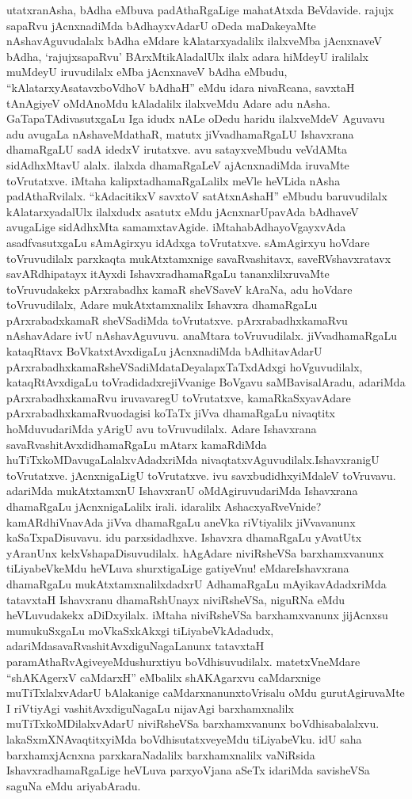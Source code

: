 \begin{artha}
utatxra\ndash  nAsha, bAdha eMbuva padAthaRgaLige mahatAtxda BeVdavide. rajujx sapaRvu jAcnxnadiMda bAdhayxvAdarU oDeda maDakeyaMte nAshavAguvudalalx bAdha eMdare kAlatarxyadalilx ilalxveMba jAcnxnaveV bAdha, `rajujxsapaRvu' BArxMtikAladalUlx ilalx adara hiMdeyU iralilalx muMdeyU iruvudilalx eMba jAcnxnaveV bAdha eMbudu, ``kAlatarxyAsatavxboVdhoV bAdhaH'' eMdu idara nivaRcana, savxtaH tAnAgiyeV oMdAnoMdu kAladalilx ilalxveMdu Adare adu nAsha. GaTapaTAdivasutxgaLu Iga idudx nALe oDedu haridu ilalxveMdeV Aguvavu adu avugaLa nAshaveMdathaR, matutx jiVvadhamaRgaLU Ishavxrana dhamaRgaLU sadA idedxV irutatxve. avu satayxveMbudu veVdAMta sidAdhxMtavU alalx. ilalxda dhamaRgaLeV ajAcnxnadiMda iruvaMte toVrutatxve. iMtaha kalipxtadhamaRgaLalilx meVle heVLida nAsha padAthaRvilalx. ``kAdacitikxV savxtoV satAtxnAshaH'' eMbudu baruvudilalx kAlatarxyadalUlx ilalxdudx asatutx eMdu jAcnxnarUpavAda bAdhaveV avugaLige sidAdhxMta samamxtavAgide. iMtaha\break bAdhayoVgayxvAda asadfvasutxgaLu sAmAgirxyu idAdxga toVrutatxve. sAmAgirxyu hoVdare toVruvudilalx parxkaqta mukAtxtamxnige savaRvashitavx, saveRVshavxratavx savARdhipatayx itAyxdi IshavxradhamaRgaLu tananxlilxruvaMte toVruvudakekx pArxrabadhx kamaR sheVSaveV kAraNa, adu hoVdare toVruvudilalx, Adare mukAtxtamxnalilx Ishavxra dhamaRgaLu pArxrabadxkamaR sheVSadiMda toVrutatxve. pArxrabadhxkamaRvu nAshavAdare ivU nAshavAguvuvu. anaMtara toVruvudilalx. jiVvadhamaRgaLu kataqRtavx BoVkatxtAvxdigaLu jAcnxnadiMda bAdhitavAdarU pArxrabadhxkamaRsheVSadiMda\break taDeyalapxTaTxdAdxgi hoVguvudilalx, kataqRtAvxdigaLu toVradidadxre\break jiVvanige BoVgavu saMBavisalAradu, adariMda pArxrabadhxkamaRvu iruvavaregU toVrutatxve, kamaRkaSxyavAdare pArxrabadhxkamaRvu\break odagisi koTaTx jiVva dhamaRgaLu nivaqtitx hoMduvudariMda yArigU avu toVruvudilalx. Adare Ishavxrana savaRvashitAvxdidhamaRgaLu mAtarx kamaRdiMda huTiTxkoMDavugaLalalxvAdadxriMda nivaqtatxvAguvudilalx.\break IshavxranigU toVrutatxve. jAcnxnigaLigU toVrutatxve. ivu savxbudidhxyiMdaleV toVruvavu. adariMda mukAtxtamxnU IshavxranU oMdAgiruvudariMda Ishavxrana dhamaRgaLu jAcnxnigaLalilx irali. idaralilx AshacxyaRveVnide? kamARdhiVnavAda jiVva dhamaRgaLu aneVka riVtiyalilx jiVvavanunx kaSaTxpaDisuvavu. idu parxsidadhxve. Ishavxra dhamaRgaLu yAvatUtx yAranUnx kelxVshapaDisuvudilalx. hAgAdare niviRsheVSa barxhamxvanunx tiLiyabeVkeMdu heVLuva shurxtigaLige gatiyeVnu! eMdare\ndash  Ishavxrana dhamaRgaLu mukAtxtamxnalilxdadxrU AdhamaRgaLu mAyikavAdadxriMda tatavxtaH Ishavxranu dhamaRshUnayx niviRsheVSa, niguRNa eMdu heVLuvudakekx aDiDxyilalx. iMtaha niviRsheVSa barxhamxvanunx jijAcnxsu mumukuSxgaLu moVkaSxkAkxgi tiLiyabeVkAdadudx, adariMda\break savaRvashitAvxdiguNagaLanunx tatavxtaH paramAthaRvAgiveyeMdu\break shurxtiyu boVdhisuvudilalx. matetxVneMdare ``shAKAgerxV caMdarxH'' eMbalilx shAKAgarxvu caMdarxnige muTiTxlalxvAdarU bAlakanige caMdarxnanunx\break toVrisalu oMdu gurutAgiruvaMte I riVtiyAgi vashitAvxdiguNagaLu nijavAgi barxhamxnalilx muTiTxkoMDilalxvAdarU niviRsheVSa barxhamxvanunx boVdhisabalalxvu. lakaSxmXNAvaqtitxyiMda boVdhisutatxveyeMdu tiLiyabeVku. idU saha barxhamxjAcnxna parxkaraNadalilx barxhamxnalilx vaNiRsida IshavxradhamaRgaLige heVLuva parxyoVjana aSeTx idariMda savisheVSa saguNa eMdu ariyabAradu.


\end{artha}
